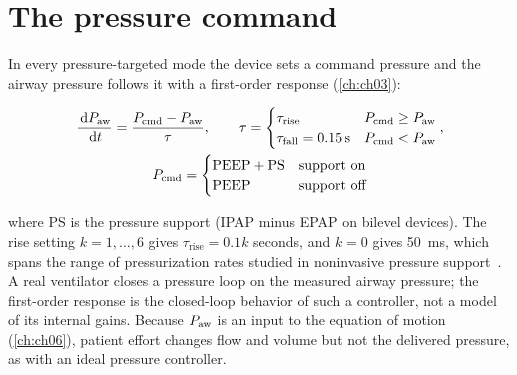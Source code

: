 \section{The pressure command}
\label{sec:modes-cmd}
In every pressure-targeted mode the device sets a command pressure and the airway pressure follows it with a first-order response (\cref{ch:ch03}):
\begin{keyequation}
\begin{equation}
\begin{gathered}
\frac{\,\mathrm{d}P_{\mathrm{aw}}}{\,\mathrm{d} t} = \frac{P_{\mathrm{cmd}} - P_{\mathrm{aw}}}{\tau},\qquad
\tau = \begin{cases}\tau_{\mathrm{rise}} & P_{\mathrm{cmd}} \ge P_{\mathrm{aw}}\\ \tau_{\mathrm{fall}} = \SI{0.15}{\second} & P_{\mathrm{cmd}} < P_{\mathrm{aw}}\end{cases},\\
P_{\mathrm{cmd}} = \begin{cases}\mathrm{PEEP} + \mathrm{PS} & \text{support on}\\ \mathrm{PEEP} & \text{support off}\end{cases}
\end{gathered}
\label{eq:modes-cmd}
\end{equation}
\end{keyequation}
where PS is the pressure support (IPAP minus EPAP on bilevel devices). The rise setting $k = 1,\dots,6$ gives $\tau_{\mathrm{rise}} = 0.1k$ seconds, and $k = 0$ gives \SI{50}{\milli\second}, which spans the range of pressurization rates studied in noninvasive pressure support~\citep{prinianakis2004}. A real ventilator closes a pressure loop on the measured airway pressure; the first-order response is the closed-loop behavior of such a controller, not a model of its internal gains. Because $P_{\mathrm{aw}}$ is an input to the equation of motion (\cref{ch:ch06}), patient effort changes flow and volume but not the delivered pressure, as with an ideal pressure controller.

